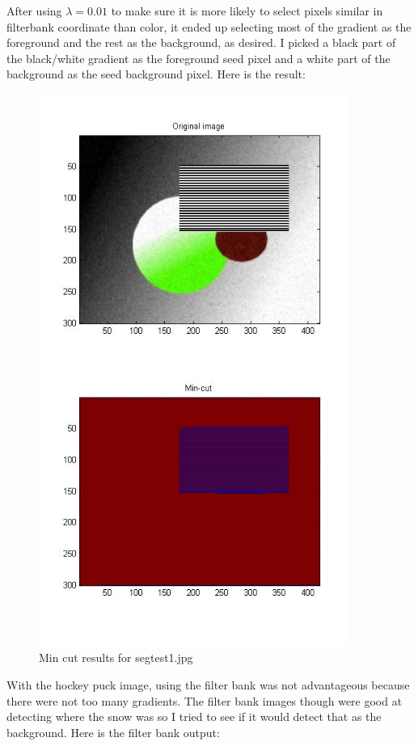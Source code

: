 \documentclass[11pt,psfig]{article}
\begin{document}
After using $\lambda=0.01$ to make sure it is more likely to select pixels similar in filterbank coordinate than color, it ended up selecting most of the gradient as the foreground and the rest as the background, as desired. I picked a black part of the black/white gradient as the foreground seed pixel and a white part of the background as the seed background pixel. Here is the result:

\begin{figure}[H]
\centering
\includegraphics[width=4in]{prob5plotB_2.jpg}
\caption{Min cut results for segtest1.jpg}
\end{figure}

With the hockey puck image, using the filter bank was not advantageous because there were not too many gradients. The filter bank images though were good at detecting where the snow was so I tried to see if it would detect that as the background. Here is the filter bank output:
\end{document}
